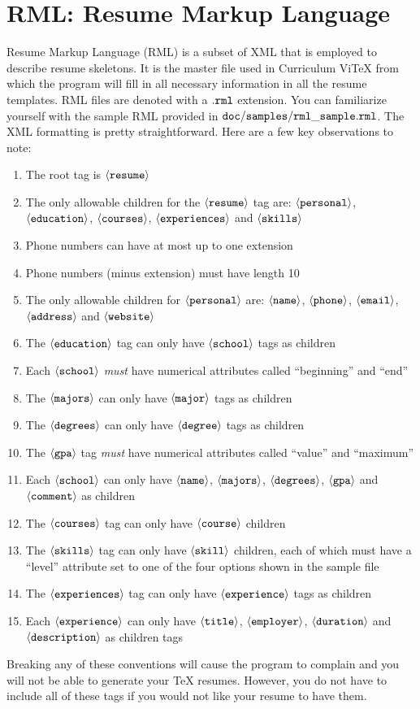 \documentclass[12pt]{article}
\newcommand{\xmltag}[1]{$\tt{\langle #1 \rangle}$}
\begin{document}
\section*{RML: Resume Markup Language}
Resume Markup Language (RML) is a subset of XML that is employed to describe
resume skeletons. It is the master file used in Curriculum ViTeX from which
the program will fill in all necessary information in all the resume templates. 
RML files are denoted with a $\tt{.rml}$ extension. You can familiarize yourself
with the sample RML provided in $\tt{doc/samples/rml\_sample.rml}$. The
XML formatting is pretty straightforward. Here are a few key observations
to note:
\begin{enumerate}
\item The root tag is \xmltag{resume}
\item The only allowable children for the \xmltag{resume} tag are:
      \xmltag{personal}, \xmltag{education}, \xmltag{courses}, \xmltag{experiences}
      and \xmltag{skills}
\item Phone numbers can have at most up to one extension
\item Phone numbers (minus extension) must have length 10
\item The only allowable children for \xmltag{personal} are: 
      \xmltag{name}, \xmltag{phone}, \xmltag{email}, \xmltag{address} and
      \xmltag{website}
\item The \xmltag{education} tag can only have \xmltag{school} tags as
      children
\item Each \xmltag{school} \emph{must} have numerical attributes called
      ``beginning'' and ``end''
\item The \xmltag{majors} can only have \xmltag{major} tags as children
\item The \xmltag{degrees} can only have \xmltag{degree} tags as children
\item The \xmltag{gpa} tag \emph{must} have numerical attributes called
      ``value'' and ``maximum''
\item Each \xmltag{school} can only have \xmltag{name}, \xmltag{majors}, 
      \xmltag{degrees}, \xmltag{gpa} and \xmltag{comment} as children
\item The \xmltag{courses} tag can only have \xmltag{course} children
\item The \xmltag{skills} tag can only have \xmltag{skill} children, each
      of which must have a ``level'' attribute set to one of the four
      options shown in the sample file
\item The \xmltag{experiences} tag can only have \xmltag{experience}
      tags as children
\item Each \xmltag{experience} can only have \xmltag{title}, \xmltag{employer},
      \xmltag{duration} and \xmltag{description} as children tags
\end{enumerate}
Breaking any of these conventions will cause the program to complain
and you will not be able to generate your TeX resumes. However, you do
not have to include all of these tags if you would not like your
resume to have them.
\newpage
\end{document}
